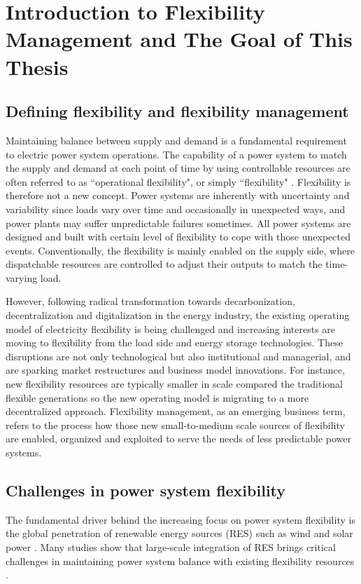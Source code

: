 \chapter{Introduction to Flexibility Management and The Goal of This Thesis}
\label{ch:introduction}

\section{Defining flexibility and flexibility management}
Maintaining balance between supply and demand is a fundamental requirement to electric power system operations. The capability of a power system to match the supply and demand at each point of time by using controllable resources are often referred to as ``operational flexibility", or simply ``flexibility" \cite{Cochran2014,Wang2017,Lund2015,Delft}. Flexibility is therefore not a new concept. Power systems are inherently with uncertainty and variability since loads vary over time and occasionally in unexpected ways, and power plants may suffer unpredictable failures sometimes. All power systems are designed and built with certain level of flexibility to cope with those unexpected events. Conventionally, the flexibility is mainly enabled on the supply side, where dispatchable resources are controlled to adjust their outputs to match the time-varying load.

However, following radical transformation towards decarbonization, decentralization and digitalization in the energy industry, the existing operating model of electricity flexibility is being challenged and increasing interests are moving to flexibility from the load side and energy storage technologies\cite{Lund2015,Bronski2015,McKinsey&Company2010}. These disruptions are not only technological but also institutional and managerial, and are sparking market restructures and business model innovations. For instance, new flexibility resources are typically smaller in scale compared the traditional flexible generations so the new operating model is migrating to a more decentralized approach. Flexibility management, as an emerging business term, refers to the process how those new small-to-medium scale sources of flexibility are enabled, organized and exploited to serve the needs of less predictable power systems.

\section{Challenges in power system flexibility}
The fundamental driver behind the increasing focus on power system flexibility is the global penetration of renewable energy sources (RES) such as wind and solar power \cite{Agency2016}. Many studies show that large-scale integration of RES brings critical challenges in maintaining power system balance with existing flexibility resources \cite{Cochran2014,Wang2017,Lund2015,FraunhoferIWES2015,Muller2016,Kwon2014,Kondziella2016,Papaefthymiou2016,Alizadeh2016,Bertsch2016}. 

